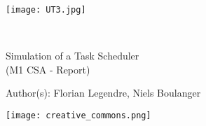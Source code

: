 \documentclass[a4paper, french]{report}
\begin{document}
\begin{titlepage}
    \begin{flushleft}
        \texttt{[image: UT3.jpg]}\par
        \centering
        
        \vspace{13\baselineskip}       
        \HRule \\[0.4cm]

        {\Huge 
        Simulation of a Task Scheduler\\ (M1 CSA - Report)\par}
        \vspace{0.4cm}
        \HRule
        \vfill
      
        Author(s): Florian Legendre, Niels Boulanger\medskip \par
        
        \texttt{[image: creative\_commons.png]}\par
    \end{flushleft}
\end{titlepage}


\newpage
\pagestyle{empty}
\tableofcontents
{}
\pagestyle{plain}

\newpage







\end{document}
